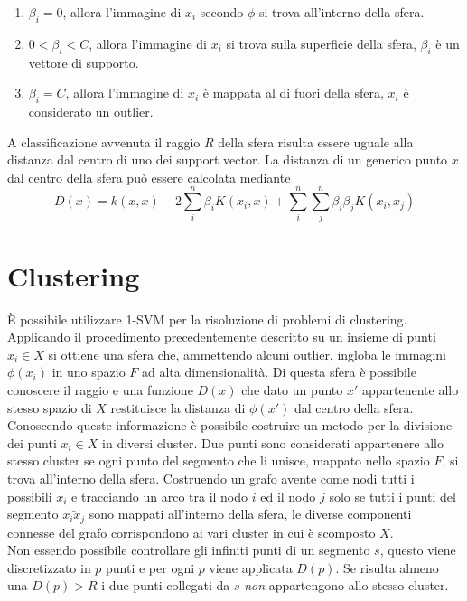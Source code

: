 \documentclass [10pt,a4paper,twoside,openright] {book}
\begin{document}
\begin{enumerate}
\item $\beta_i = 0$, allora l'immagine di $x_i$ secondo $\phi$ si trova all'interno della sfera.
\item $0 < \beta_i < C$, allora l'immagine di $x_i$ si trova sulla superficie della sfera, $\beta_i$ è un vettore di supporto.
\item$\beta_i = C$, allora l'immagine di $x_i$ è mappata al di fuori della sfera, $x_i$ è considerato un outlier.
\end{enumerate}
A classificazione avvenuta il raggio $R$ della sfera risulta essere uguale alla distanza dal centro di uno dei support vector. La distanza di un generico punto $x$ dal centro della sfera può essere calcolata mediante
\[
D(x) = k(x,x) - 2\sum_i^n \beta_i K(x_i,x) + \sum_i^n \sum_j^n \beta_i \beta_j K(x_i, x_j)
\]
\section{Clustering}
È possibile utilizzare 1-SVM per la risoluzione di problemi di clustering. Applicando il procedimento precedentemente descritto su un insieme di punti $x_i \in X$ si ottiene una sfera che, ammettendo alcuni outlier, ingloba le immagini $\phi(x_i)$ in uno spazio $F$ ad alta dimensionalità. Di questa sfera è possibile conoscere il raggio e una funzione $D(x)$ che dato un punto $x'$ appartenente allo stesso spazio di $X$ restituisce la distanza di $\phi(x')$ dal centro della sfera. Conoscendo queste informazione è possibile costruire un metodo per la divisione dei punti $x_i \in X$ in diversi cluster. Due punti sono considerati appartenere allo stesso cluster se ogni punto del segmento che li unisce, mappato nello spazio $F$, si trova all'interno della sfera. Costruendo un grafo avente come nodi tutti i possibili $x_i$ e tracciando un arco tra il nodo $i$ ed il nodo $j$ solo se tutti i punti del segmento $\bar{x_ix_j}$ sono mappati all'interno della sfera, le diverse componenti connesse del grafo corrispondono ai vari cluster in cui è scomposto $X$.\\
Non essendo possibile controllare gli infiniti punti di un segmento $s$, questo viene discretizzato in $p$ punti e per ogni $p$ viene applicata $D(p)$. Se risulta almeno una $D(p) > R$ i due punti collegati da $s$ \textit{non} appartengono allo stesso cluster.


\end{document}
